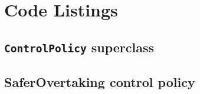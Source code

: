\chapter{Code Listings}\label{appendix:code}

\section{\texttt{ControlPolicy} superclass}\label{code:control_policy}



\section{SaferOvertaking control policy}\label{code:improved_policy}



